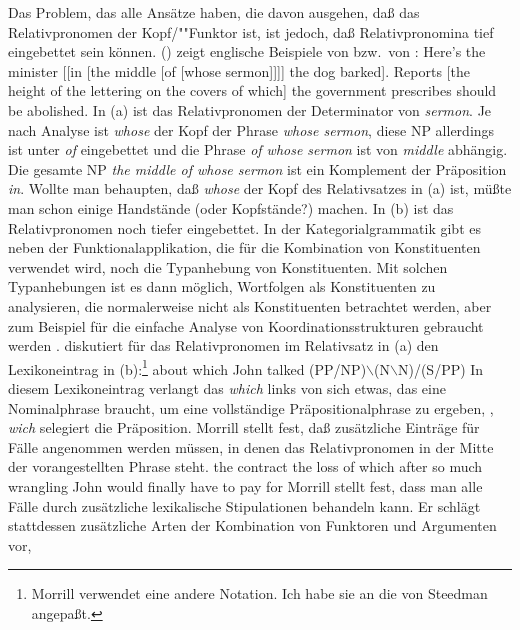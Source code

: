 Das Problem, das alle Ansätze haben, die davon ausgehen, daß das Relativpronomen der
Kopf/""Funktor ist, ist jedoch, daß Relativpronomina tief eingebettet sein können.
() zeigt englische Beispiele von \citet[]{ps2} bzw.\ von \citet[]{Ross67}\nocite{Ross86a-u}:
\eal
\ex Here's the minister [[in [the middle [of [whose sermon]]]] the dog barked].
\ex Reports [the height of the lettering on the covers of which] the government prescribes should be abolished.
\zl
In (a) ist das Relativpronomen der Determinator von \emph{sermon}.
Je nach Analyse ist \emph{whose} der Kopf der Phrase \emph{whose sermon},
diese NP allerdings ist unter \emph{of} eingebettet und die Phrase \emph{of whose sermon}
ist von \emph{middle} abhängig. Die gesamte NP \emph{the middle of whose sermon}
ist ein Komplement der Präposition \emph{in}. Wollte man behaupten, daß \emph{whose}
der Kopf des Relativsatzes in (a) ist, müßte man schon einige Handstände (oder Kopfstände?)
machen. In (b) ist das Relativpronomen noch tiefer eingebettet.
In der Kategorialgrammatik gibt es neben der Funktionalapplikation, die
für die Kombination von Konstituenten verwendet wird, noch die Typanhebung von
Konstituenten. Mit solchen Typanhebungen ist es dann möglich, Wortfolgen als
Konstituenten zu analysieren, die normalerweise nicht als Konstituenten betrachtet
werden, aber zum Beispiel für die einfache Analyse von Koordinationsstrukturen
gebraucht werden \citep{Steedman89a}. \citet[]{Morrill95a} diskutiert für das
Relativpronomen im Relativsatz in (a) den Lexikoneintrag in (b):\footnote{
  Morrill verwendet eine andere Notation. Ich habe sie an die von Steedman angepaßt.
}
\eal
\ex about which John talked
\ex (PP/NP)$\backslash$(N$\backslash$N)/(S/PP)
\zl
In diesem Lexikoneintrag verlangt das \emph{which} links von sich etwas, das eine Nominalphrase
braucht, um eine vollständige Präpositionalphrase zu ergeben, \dash, \emph{wich} selegiert die
Präposition. Morrill stellt fest, daß zusätzliche Einträge für Fälle angenommen werden müssen, in
denen das Relativpronomen in der Mitte der vorangestellten Phrase steht.
\ea
the contract the loss of which after so much wrangling John would finally have to pay for
\z
Morrill stellt fest, dass man alle Fälle durch zusätzliche lexikalische Stipulationen behandeln
kann. Er schlägt stattdessen zusätzliche Arten der Kombination von Funktoren und Argumenten vor,
